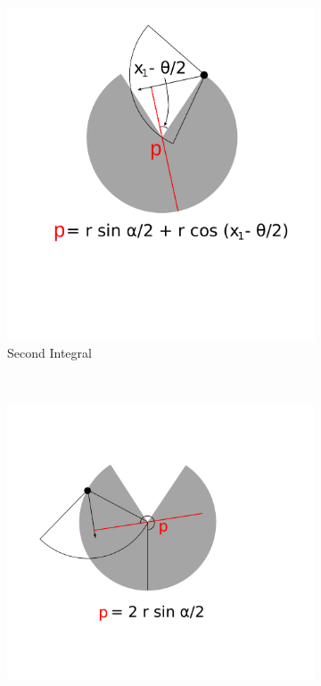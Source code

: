 \documentclass[a4paper,10pt,reqno,oneside]{amsart}
\begin{document}
\begin{figure}[t]
	\begin{subfigure}[t]{0.45\textwidth}
                \centering
		\includegraphics[width=1\textwidth, trim= 6cm 1cm 6cm 0.3cm]{imgs/secondIntegral.pdf}
                \caption{Second Integral}
                \label{f:secondInt}
        \end{subfigure}%
	~ 
	\begin{subfigure}[t]{0.45\textwidth}
                \centering
		\includegraphics[width=1\textwidth, trim= 6cm 1cm 6cm 0.3cm]{imgs/thirdIntegral.pdf}

\end{subfigure}
\end{figure}
\end{document}

